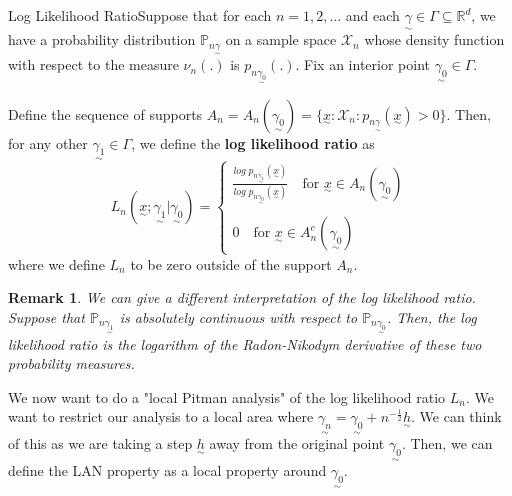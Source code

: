 \documentclass[twoside]{article}
\newtheorem{remark}[theorem]{Remark}
\newcommand{\prob}{\mathbb{P}}
\newcommand{\utilde}{\underset{\sim}}
\begin{document}
\begin{definition_exam}{Log Likelihood Ratio}{}Suppose that for each $n = 1,2,...$ and each $\utilde{\gamma} \in \Gamma \subseteq \mathbb{R}^d$, we have a probability distribution $\prob_{n \utilde{\gamma}}$ on a sample space $\mathcal{X}_n$ whose density function with respect to the measure $\nu_n(.)$ is $p_{n \utilde{\gamma_{0}}}(.).$ Fix an interior point $\utilde{\gamma_0} \in \Gamma.$

Define the sequence of supports $A_n = A_n(\utilde{\gamma_0}) = \{\utilde{x}: \mathcal{X}_n: p_{n \utilde{\gamma}}(\utilde{x}) > 0 \}$. Then, for any other $\utilde{\gamma_1} \in \Gamma$, we define the \textbf{log likelihood ratio} as 
$$
L_n(\utilde{x}; \utilde{\gamma_1}|\utilde{\gamma_0}) = 
\begin{cases}
\frac{log\;p_{n \utilde{\gamma_{1}}}(\utilde{x}) }{log\;p_{n \utilde{\gamma_{0}}}(\utilde{x})} \quad \text{for } \utilde{x} \in A_n(\utilde{\gamma_{0}})\\\\
0 \quad \text{for } \utilde{x} \in A_n^c(\utilde{\gamma_{0}})
\end{cases}
$$
where we define $L_n$ to be zero outside of the support $A_n.$
\end{definition_exam}

\begin{remark}
We can give a different interpretation of the log likelihood ratio. Suppose that $\prob_{n\utilde{\gamma_1}}$ is absolutely continuous with respect to $\prob_{n\utilde{\gamma_0}}$. Then, the log likelihood ratio is the logarithm of the Radon-Nikodym derivative of these two probability measures.
\end{remark}

We now want to do a "local Pitman analysis" of the log likelihood ratio $L_n.$ We want to restrict our analysis to a local area where $\utilde{\gamma_n} = \utilde{\gamma_0} + n^{-\frac{1}{2}}\utilde{h}.$ We can think of this as we are taking a step $\utilde{h}$ away from the original point $\utilde{\gamma_0}$. Then, we can define the LAN property as a local property around $\utilde{\gamma_0}.$
\end{document}
